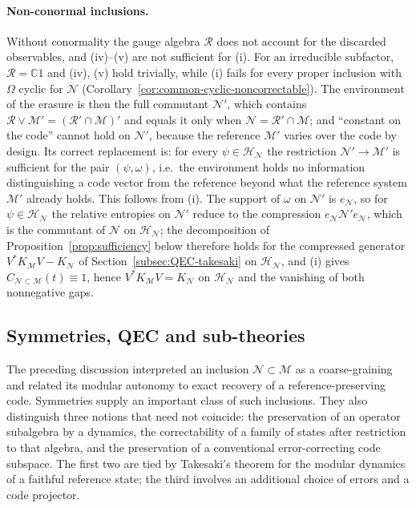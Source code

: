 \documentclass[a4paper,11pt]{article}
\theoremstyle{definition}
\newcommand{\mR}{\mathcal{R}}
\newcommand{\mN}{\mathcal{N}}
\newcommand{\mH}{\mathcal{H}}
\newcommand{\mM}{\mathcal{M}}
\begin{document}
\paragraph{Non-conormal inclusions.}
Without conormality the gauge algebra $\mR$ does not account for the discarded observables, and (iv)--(v) are not sufficient for (i). For an irreducible subfactor, $\mR=\mathbb C1$ and (iv), (v) hold trivially, while (i) fails for every proper inclusion with $\Omega$ cyclic for $\mN$ (Corollary~\ref{cor:common-cyclic-noncorrectable}). The environment of the erasure is then the full commutant $\mN'$, which contains $\mR\vee\mM'=(\mR'\cap\mM)'$ and equals it only when $\mN=\mR'\cap\mM$; and ``constant on the code'' cannot hold on $\mN'$, because the reference $\mM'$ varies over the code by design. Its correct replacement is: for every $\psi\in\mH_{\mN}$ the restriction $\mN'\to\mM'$ is sufficient for the pair $(\psi,\omega)$, i.e.\ the environment holds no information distinguishing a code vector from the reference beyond what the reference system $\mM'$ already holds. This follows from (i). The support of $\omega$ on $\mN'$ is $e_{\mN}$, so for $\psi\in\mH_{\mN}$ the relative entropies on $\mN'$ reduce to the compression $e_{\mN}\mN'e_{\mN}$, which is the commutant of $\mN$ on $\mH_{\mN}$; the decomposition of Proposition~\ref{prop:sufficiency} below therefore holds for the compressed generator $V^*K_{\mM}V-K_{\mN}$ of Section~\ref{subsec:QEC-takesaki} on $\mH_{\mN}$, and (i) gives $C_{\mN\subset\mM}(t)\equiv1$, hence $V^*K_{\mM}V=K_{\mN}$ on $\mH_{\mN}$ and the vanishing of both nonnegative gaps.


\subsection{Symmetries, QEC and sub-theories}\label{subsec:symmetries-QEC-subtheories}

The preceding discussion interpreted an inclusion $\mN\subset\mM$ as a
coarse-graining and related its modular autonomy to exact recovery of a
reference-preserving code. Symmetries supply an important class of such
inclusions. They also distinguish three notions that need not coincide:
the preservation of an operator subalgebra by a dynamics, the correctability
of a family of states after restriction to that algebra, and the preservation
of a conventional error-correcting code subspace. The first two are tied by
Takesaki's theorem for the modular dynamics of a faithful reference state;
the third involves an additional choice of errors and a code projector.
\end{document}
